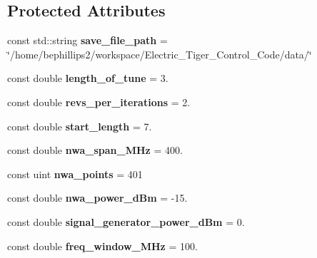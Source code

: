 \subsection*{Protected Attributes}
\begin{DoxyCompactItemize}
\item 
const std\+::string {\bfseries save\+\_\+file\+\_\+path} = \char`\"{}/home/bephillips2/workspace/Electric\+\_\+\+Tiger\+\_\+\+Control\+\_\+\+Code/data/\char`\"{}\hypertarget{class_program_core_a8c7341af6243a6fc20406d23da8687a6}{}\label{class_program_core_a8c7341af6243a6fc20406d23da8687a6}

\item 
const double {\bfseries length\+\_\+of\+\_\+tune} = 3.\hypertarget{class_program_core_a593d3ef7d91e1868812fb416c9c55f46}{}\label{class_program_core_a593d3ef7d91e1868812fb416c9c55f46}

\item 
const double {\bfseries revs\+\_\+per\+\_\+iterations} = 2.\hypertarget{class_program_core_ad5b37ffa5251a84cf29b39077bcc4512}{}\label{class_program_core_ad5b37ffa5251a84cf29b39077bcc4512}

\item 
const double {\bfseries start\+\_\+length} = 7.\hypertarget{class_program_core_a8dcf1ac59a866997841b071e5ec6a6cf}{}\label{class_program_core_a8dcf1ac59a866997841b071e5ec6a6cf}

\item 
const double {\bfseries nwa\+\_\+span\+\_\+\+M\+Hz} = 400.\hypertarget{class_program_core_a54eb9a5f4209dc6f3127c1a5260139c4}{}\label{class_program_core_a54eb9a5f4209dc6f3127c1a5260139c4}

\item 
const uint {\bfseries nwa\+\_\+points} = 401\hypertarget{class_program_core_ac3bf345065d1afa89bc2430bf3652aba}{}\label{class_program_core_ac3bf345065d1afa89bc2430bf3652aba}

\item 
const double {\bfseries nwa\+\_\+power\+\_\+d\+Bm} = -\/15.\hypertarget{class_program_core_ae04f9a2d8adf21107535684bea3135ed}{}\label{class_program_core_ae04f9a2d8adf21107535684bea3135ed}

\item 
const double {\bfseries signal\+\_\+generator\+\_\+power\+\_\+d\+Bm} = 0.\hypertarget{class_program_core_a26126000feb184dcf9495f30bc8fae38}{}\label{class_program_core_a26126000feb184dcf9495f30bc8fae38}

\item 
const double {\bfseries freq\+\_\+window\+\_\+\+M\+Hz} = 100.\hypertarget{class_program_core_adf6c4d9be83cbe2e934ef65450de93e8}{}\label{class_program_core_adf6c4d9be83cbe2e934ef65450de93e8}


\end{DoxyCompactItemize}
